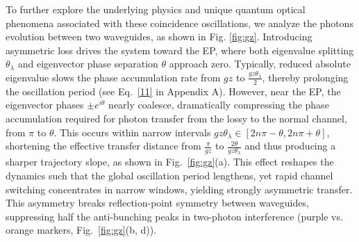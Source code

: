 \documentclass[%
reprint,
superscriptaddress,
amsthm,amsmath,amssymb,
aps,
]{revtex4-1}
\begin{document}
 



To further explore the underlying physics and unique quantum optical phenomena associated with these coincidence oscillations, we analyze the photons evolution between two waveguides, as shown in Fig. \ref{fig:gz}. Introducing asymmetric loss drives the system toward the EP, where both eigenvalue splitting $\theta_{\lambda}$ and eigenvector phase separation $\theta$ approach zero. Typically, reduced absolute eigenvalue slows the phase accumulation rate from $gz$ to $\frac{gz\theta_{\lambda}}{2}$, thereby prolonging the oscillation period (see Eq.~\ref{11} in Appendix A). However, near the EP, the eigenvector phases $\pm e^{i\theta}$ nearly coalesce, dramatically compressing the phase accumulation required for photon transfer from the lossy to the normal channel, from $\pi$ to $\theta $. This occurs within narrow intervals $gz\theta_{\lambda}\in[2n\pi-\theta, 2n\pi+\theta]$, shortening the effective transfer distance from $\frac{\pi}{gz}$ to $\frac{2\theta}{gz\theta_{\lambda}}$ and thus producing a sharper trajectory slope, as shown in Fig.~\ref{fig:gz}(a). This effect reshapes the dynamics such that the global oscillation period lengthens, yet rapid channel switching concentrates in narrow windows, yielding strongly asymmetric transfer. This asymmetry breaks reflection-point symmetry between waveguides, suppressing half the anti-bunching peaks in two-photon interference (purple vs. orange markers, Fig.~\ref{fig:gz}(b, d)).
\end{document}
